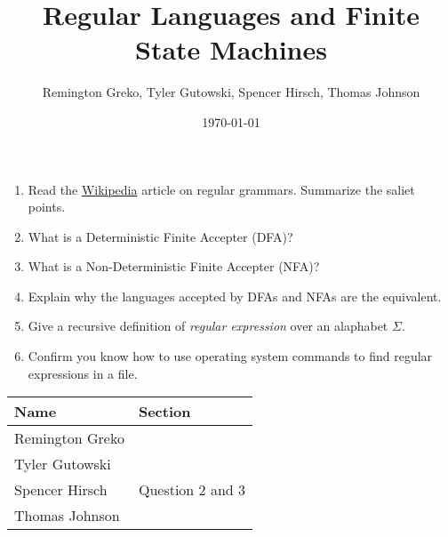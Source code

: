 \documentclass{article}
\begin{document}
\title{Regular Languages and Finite State Machines}
\author{Remington Greko, Tyler Gutowski, Spencer Hirsch, Thomas Johnson}
\date{\today}

\maketitle

\begin{enumerate}
    \item Read the \href{https://en.wikipedia.org/wiki/Regular_grammar}{Wikipedia} article on regular grammars. Summarize
            the saliet points.

    \medskip


    \medskip

    \item What is a Deterministic Finite Accepter (DFA)?
    
    \medskip


    \medskip

    \item What is a Non-Deterministic Finite Accepter (NFA)?
    
    \medskip


    \medskip

    \item Explain why the languages accepted by DFAs and NFAs are the equivalent.
    
    \medskip


    \medskip

    \item Give a recursive definition of \textit{regular expression} over
            an alaphabet $\Sigma$.

    \medskip


    \medskip

    \item Confirm you know how to use operating system commands to find
            regular expressions in a file.

    \medskip


    \medskip
\end{enumerate}

\pagebreak

\begin{center}
    \begin{tabular}{|p{3cm}|p{6cm}|}
        \hline
        \textbf{Name} & \textbf{Section} \\
        \hline
        Remington Greko &  \\
        \hline
        Tyler Gutowski &  \\
        \hline
        Spencer Hirsch &  Question 2 and 3\\
        \hline
        Thomas Johnson &  \\
        \hline
    \end{tabular}
\end{center}
\end{document}
